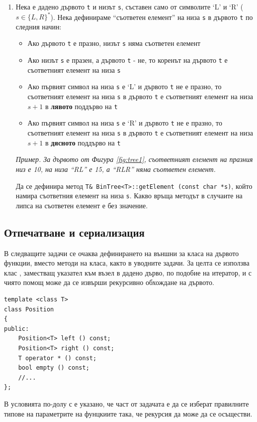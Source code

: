 \begin{enumerate}[]
	\item Нека е дадено дървото \texttt{t} и низът \texttt{s}, съставен само от символите `L' и `R' ($s \in \{L,R\}^*$). Нека дефинираме ``съответен елемент'' на низа \texttt{s} в дървото \texttt{t} по следния начин:
	\begin{itemize}
		\item Ако дървото \texttt{t} е празно, низът \texttt{s} няма съответен елемент
		\item Ако низът \texttt{s} е празен, а дървото \texttt{t} - не, то коренът на дървото \texttt{t} е съответният елемент на низа \texttt{s}
		\item Ако първият символ на низа \texttt{s} е `L' и дървото \texttt{t} не е празно, то съответният елемент на низа \texttt{s} в дървото \texttt{t} е съответният елемент на низа $s+1$ в \textbf{лявото} поддърво на \texttt{t}
		\item Ако първият символ на низа \texttt{s} е `R' и дървото \texttt{t} не е празно, то съответният елемент на низа \texttt{s} в дървото \texttt{t} е съответният елемент на низа $s+1$ в \textbf{дясното} поддърво на \texttt{t}
	\end{itemize}

	\textit{Пример. За 	дървото от Фигура \ref{fig:tree1}, съответният елемент на празния низ е 10, на низа ``RL'' е 15, а ``RLR'' няма съответен елемент.}

	Да се дефинира метод \texttt{T\& BinTree<T>::getElement (const char *s)}, който намира съответния елемент на низа \texttt{s}. Какво връща методът в случаите на липса на съответен елемент е без значение.


\end{enumerate}

\subsection {Отпечатване и сериализация}

\begin{mdframed}[hidealllines=true,backgroundcolor=gray!20]
  В следващите задачи се очаква дефинирането на външни за класа на дървото функции, вместо методи на класа, както в уводните задачи. За целта се използва клас , заместващ указател към възел в дадено дърво, по подобие на итератор, и с чиято помощ може да се извърши рекурсивно обхождане на дървото.
  \begin{verbatim}
template <class T>
class Position 
{
public:
    Position<T> left () const;
    Position<T> right () const;
    T operator * () const;
    bool empty () const;
    //...
};
  \end{verbatim}

  В условията по-долу с  е указано, че част от задачата е да се изберат правилните типове на параметрите на фунцкиите така, че рекурсия да може да се осъществи.
\end{mdframed}
  
